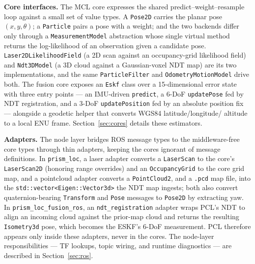 \textbf{Core interfaces.} The MCL core expresses the shared
predict--weight--resample loop against a small set of value types.
A \texttt{Pose2D} carries the planar pose $(x, y, \theta)$; a \texttt{Particle}
pairs a pose with a weight; and the two backends differ only through a
\texttt{MeasurementModel} abstraction whose single virtual method
returns the log-likelihood of an observation given a candidate pose.
\texttt{Laser2DLikelihoodField} (a 2D scan against an occupancy-grid
likelihood field) and \texttt{Ndt3DModel} (a 3D cloud against a
Gaussian-voxel NDT map) are its two implementations, and the same
\texttt{ParticleFilter} and \texttt{OdometryMotionModel} drive both.
The fusion core exposes an \texttt{Eskf} class over a 15-dimensional
error state with three entry points --- an IMU-driven
\texttt{predict}, a 6-DoF \texttt{updatePose} fed by NDT registration,
and a 3-DoF \texttt{updatePosition} fed by an absolute position fix ---
alongside a geodetic helper that converts WGS84 latitude/longitude/
altitude to a local ENU frame. Section~\ref{sec:cores} details these
estimators.

\textbf{Adapters.} The node layer bridges ROS message types to the
middleware-free core types through thin adapters, keeping the cores
ignorant of message definitions. In \texttt{prism\_loc}, a laser
adapter converts a \texttt{LaserScan} to the core's \texttt{LaserScan2D}
(honoring range overrides) and an \texttt{OccupancyGrid} to the core
grid map, and a pointcloud adapter converts a \texttt{PointCloud2}, and
a \texttt{.pcd} map file, into the \texttt{std::vector<Eigen::Vector3d>}
the NDT map ingests; both also convert quaternion-bearing
\texttt{Transform} and \texttt{Pose} messages to \texttt{Pose2D} by
extracting yaw. In \texttt{prism\_loc\_fusion\_ros}, an
\texttt{ndt\_registration} adapter wraps PCL's NDT to align an incoming
cloud against the prior-map cloud and returns the resulting
\texttt{Isometry3d} pose, which becomes the ESKF's 6-DoF measurement.
PCL therefore appears only inside these adapters, never in the cores.
The node-layer responsibilities --- TF lookups, topic wiring, and
runtime diagnostics --- are described in Section~\ref{sec:ros}.
